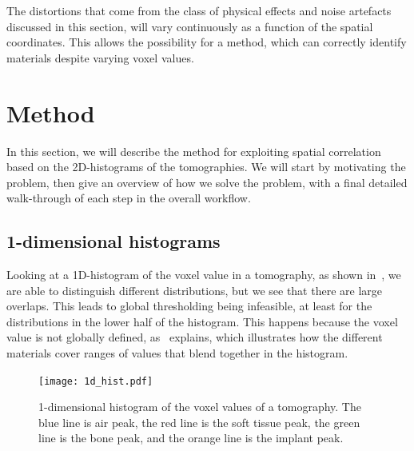 \documentclass[pdflatex,sn-mathphys]{sn-jnl}%
\theoremstyle{thmstyleone}%
\theoremstyle{thmstyletwo}%
\theoremstyle{thmstylethree}%
\begin{document}
The distortions that come from the class of physical effects and noise artefacts discussed in this
section, will vary continuously as a function of the spatial coordinates. This allows the possibility
for a method, which can correctly identify materials despite varying voxel values.


\section{Method}\label{sec:method}
In this section, we will describe the method for exploiting spatial correlation based on the
2D-histograms of the tomographies. We will start by motivating the problem, then give an overview
of how we solve the problem, with a final detailed walk-through of each step in the overall workflow.

\subsection{1-dimensional histograms}
Looking at a 1D-histogram of the voxel value in a tomography, as shown in~, we are
able to distinguish different distributions, but we see that there are large overlaps. This leads to
global thresholding being infeasible, at least for the distributions in the lower half of the histogram.
This happens because the voxel value is not globally defined, as~ explains, which
illustrates how the different materials cover ranges of values that blend together in the histogram.

\begin{figure}
    \centering
    \texttt{[image: 1d\_hist.pdf]}
    \caption{1-dimensional histogram of the voxel values of a tomography. The blue line is air peak,
    the red line is the soft tissue peak, the green line is the bone peak, and the orange line is
    the implant peak.}
    \label{fig:1d-hist}
\end{figure}
\end{document}

